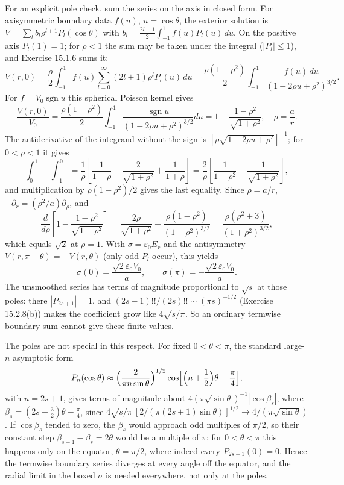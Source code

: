 For an explicit pole check, sum the series on the axis in closed form.
For axisymmetric boundary data $f(u)$, $u=\cos\theta$, the exterior
solution is $V=\sum_lb_l\rho^{l+1}P_l(\cos\theta)$ with
$b_l=\frac{2l+1}2\int_{-1}^1f(u)P_l(u)\,du$. On the positive axis
$P_l(1)=1$; for $\rho<1$ the sum may be taken under the integral
($|P_l|\le1$), and Exercise 15.1.6 sums it:
\[
V(r,0)=\frac\rho2\int_{-1}^1f(u)\sum_{l=0}^\infty(2l+1)\rho^lP_l(u)\,du
=\frac{\rho(1-\rho^2)}2\int_{-1}^1
\frac{f(u)\,du}{(1-2\rho u+\rho^2)^{3/2}}.
\]
For $f=V_0\operatorname{sgn}u$ this spherical Poisson kernel gives
\[
\frac{V(r,0)}{V_0}
=\frac{\rho(1-\rho^2)}2\int_{-1}^1
\frac{\operatorname{sgn}u}{(1-2\rho u+\rho^2)^{3/2}}du
=1-\frac{1-\rho^2}{\sqrt{1+\rho^2}},\quad \rho=\frac ar.
\]
The antiderivative of the integrand without the sign is
$[\rho\sqrt{1-2\rho u+\rho^2}]^{-1}$; for $0<\rho<1$ it gives
\[
\int_0^1-\int_{-1}^0
=\frac1\rho\left[\frac1{1-\rho}-\frac2{\sqrt{1+\rho^2}}
+\frac1{1+\rho}\right]
=\frac2\rho\left[\frac1{1-\rho^2}-\frac1{\sqrt{1+\rho^2}}\right],
\]
and multiplication by $\rho(1-\rho^2)/2$ gives the last equality.
Since $\rho=a/r$, $-\partial_r=(\rho^2/a)\partial_\rho$, and
\[
\frac d{d\rho}\left[1-\frac{1-\rho^2}{\sqrt{1+\rho^2}}\right]
=\frac{2\rho}{\sqrt{1+\rho^2}}+\frac{\rho(1-\rho^2)}{(1+\rho^2)^{3/2}}
=\frac{\rho(\rho^2+3)}{(1+\rho^2)^{3/2}},
\]
which equals $\sqrt2$ at $\rho=1$. With $\sigma=\varepsilon_0E_r$ and
the antisymmetry $V(r,\pi-\theta)=-V(r,\theta)$ (only odd $P_l$
occur), this yields
\[
\boxed{\sigma(0)=\frac{\sqrt2\varepsilon_0V_0}{a},
\qquad \sigma(\pi)=-\frac{\sqrt2\varepsilon_0V_0}{a}}.
\]
The unsmoothed series has terms of magnitude proportional to $\sqrt s$
at those poles: there $|P_{2s+1}|=1$, and
$(2s-1)!!/(2s)!!\sim(\pi s)^{-1/2}$ (Exercise 15.2.8(b)) makes the
coefficient grow like $4\sqrt{s/\pi}$. So an ordinary termwise
boundary sum cannot give these finite values.

The poles are not special in this respect. For fixed $0<\theta<\pi$,
the standard large-$n$ asymptotic form
\[
P_n(\cos\theta)\approx\Bigl(\frac2{\pi n\sin\theta}\Bigr)^{1/2}
\cos\Bigl[\Bigl(n+\frac12\Bigr)\theta-\frac\pi4\Bigr],
\]
with $n=2s+1$, gives terms of magnitude about
$4(\pi\sqrt{\sin\theta})^{-1}|\cos\beta_s|$, where
$\beta_s=(2s+\frac32)\theta-\frac\pi4$, since
$4\sqrt{s/\pi}\,[2/(\pi(2s+1)\sin\theta)]^{1/2}
\to4/(\pi\sqrt{\sin\theta})$. If $\cos\beta_s$ tended to zero, the
$\beta_s$ would approach odd multiples of $\pi/2$, so their constant
step $\beta_{s+1}-\beta_s=2\theta$ would be a multiple of $\pi$; for
$0<\theta<\pi$ this happens only on the equator, $\theta=\pi/2$, where
indeed every $P_{2s+1}(0)=0$. Hence the termwise boundary series
diverges at every angle off the equator, and the radial limit in the
boxed $\sigma$ is needed everywhere, not only at the poles.

